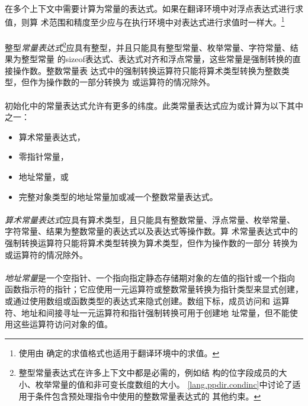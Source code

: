\semantic
\paragraph{}
在多个上下文中需要计算为常量的表达式。如果在翻译环境中对浮点表达式进行求值，则算
术范围和精度至少应与在执行环境中对表达式进行求值时一样大。\footnote{使用由
确定的求值格式也适用于翻译环境中的求值。}

\paragraph{}
整型\textit{常量表达式}\footnote{整型常量表达式在许多上下文中都是必需的，例如结
构的位字段成员的大小、枚举常量的值和非可变长度数组的大小。
\ref{lang.ppdir.condinc}中讨论了适用于条件包含预处理指令中使用的整数常量表达式的
其他约束。}应具有整型，并且只能具有整型常量、枚举常量、字符常量、结果为整型常量
的sizeof表达式、表达式对齐和浮点常量，这些常量是强制转换的直接操作数。整数常量表
达式中的强制转换运算符只能将算术类型转换为整数类型，但作为操作数的一部分转换为
或运算符的情况除外。

\paragraph{}
初始化中的常量表达式允许有更多的纬度。此类常量表达式应为或计算为以下其中之一：
\begin{itemize}
  \item{算术常量表达式，}
  \item{零指针常量，}
  \item{地址常量，或}
  \item{完整对象类型的地址常量加或减一个整数常量表达式。}
\end{itemize}

\paragraph{}
\textit{算术常量表达式}应具有算术类型，且只能具有整数常量、浮点常量、枚举常量、
字符常量、结果为整数常量的表达式以及表达式等操作数。算
术常量表达式中的强制转换运算符只能将算术类型转换为算术类型，但作为操作数的一部分
转换为或运算符的情况除外。

\paragraph{}
\textit{地址常量}是一个空指针、一个指向指定静态存储期对象的左值的指针或一个指向
函数指示符的指针；它应使用一元运算符\tm{\&}或整数常量转换为指针类型来显式创建，
或通过使用数组或函数类型的表达式来隐式创建。数组下标\tm{[]}，成员访问和
\tm{-\tg}运算符、地址\tm{\&}和间接寻址\tm{*}一元运算符和指针强制转换可用于创建地
址常量，但不能使用这些运算符访问对象的值。

